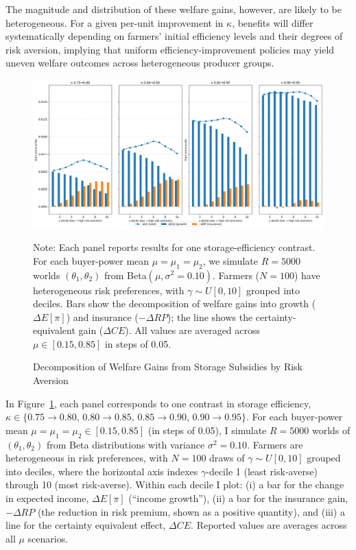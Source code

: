 The magnitude and distribution of these welfare gains, however, are likely to be heterogeneous. For a given per-unit improvement in $\kappa$, benefits will differ systematically depending on farmers' initial efficiency levels and their degrees of risk aversion, implying that uniform efficiency-improvement policies may yield uneven welfare outcomes across heterogeneous producer groups.

\begin{figure}[ht]
    \centering
    \includegraphics[width=\linewidth]{model_figures/storage_subsidy_gain_decomposition.png}
    \caption{Decomposition of Welfare Gains from Storage Subsidies by Risk Aversion}
    \label{fig:storage_subsidy_gain_decomposition}
    \begin{tablenotes}
    \footnotesize
    \item Note: Each panel reports results for one storage-efficiency contrast. For each buyer-power mean $\mu=\mu_1=\mu_2$, we simulate $R=5000$ worlds $(\theta_1,\theta_2)$ from Beta$(\mu,\sigma^2=0.10)$. Farmers ($N=100$) have heterogeneous risk preferences, with $\gamma \sim U[0,10]$ grouped into deciles. Bars show the decomposition of welfare gains into growth ($\Delta E[\pi]$) and insurance ($-\Delta RP$); the line shows the certainty-equivalent gain ($\Delta CE$). All values are averaged across $\mu \in [0.15,0.85]$ in steps of 0.05.
    \end{tablenotes}
\end{figure}

In Figure~\ref{fig:storage_subsidy_gain_decomposition}, each panel corresponds to one contrast in storage efficiency, $\kappa \in \{0.75\to0.80,\,0.80\to0.85,\,0.85\to0.90,\,0.90\to0.95\}$. For each buyer-power mean $\mu=\mu_1=\mu_2 \in [0.15,0.85]$ (in steps of 0.05), I simulate $R=5000$ worlds of $(\theta_1,\theta_2)$ from Beta distributions with variance $\sigma^2=0.10$. Farmers are heterogeneous in risk preferences, with $N=100$ draws of $\gamma \sim U[0,10]$ grouped into deciles, where the horizontal axis indexes $\gamma$-decile 1 (least risk-averse) through 10 (most risk-averse). Within each decile I plot: (i) a bar for the change in expected income, $\Delta E[\pi]$ (``income growth''), (ii) a bar for the insurance gain, $-\Delta RP$ (the reduction in risk premium, shown as a positive quantity), and (iii) a line for the certainty equivalent effect, $\Delta CE$. Reported values are averages across all $\mu$ scenarios.

